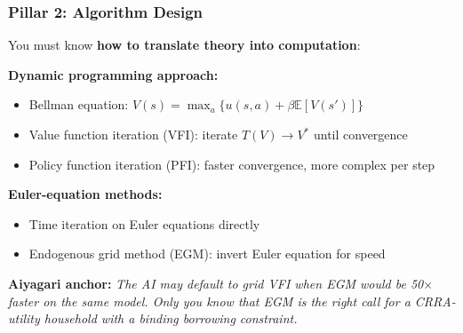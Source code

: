 \documentclass[10pt,english,aspectratio=169]{beamer}
\begin{document}
\begin{frame}
\frametitle{Pillar 2: Algorithm Design}

You must know \textbf{how to translate theory into computation}:

\vspace{0.2cm}

\textbf{Dynamic programming approach:}
\begin{itemize}
    \item Bellman equation: $V(s) = \max_a \{u(s,a) + \beta \mathbb{E}[V(s')]\}$
    \item Value function iteration (VFI): iterate $T(V) \to V^*$ until convergence
    \item Policy function iteration (PFI): faster convergence, more complex per step
\end{itemize}

\textbf{Euler-equation methods:}
\begin{itemize}
    \item Time iteration on Euler equations directly
    \item Endogenous grid method (EGM): invert Euler equation for speed
\end{itemize}

\vspace{0.3cm}

\textbf{Aiyagari anchor:} \textit{The AI may default to grid VFI when EGM would be 50$\times$ faster on the same model. Only you know that EGM is the right call for a CRRA-utility household with a binding borrowing constraint.}
\end{frame}
\end{document}
